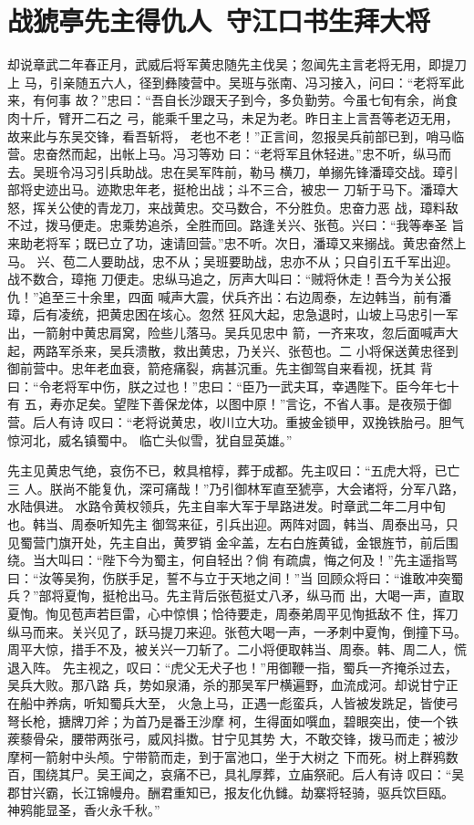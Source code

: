 \chapter{战猇亭先主得仇人~守江口书生拜大将}

却说章武二年春正月，武威后将军黄忠随先主伐吴；忽闻先主言老将无用，即提刀上
马，引亲随五六人，径到彝陵营中。吴班与张南、冯习接入，问曰：“老将军此来，有何事
故？”忠曰：“吾自长沙跟天子到今，多负勤劳。今虽七旬有余，尚食肉十斤，臂开二石之
弓，能乘千里之马，未足为老。昨日主上言吾等老迈无用，故来此与东吴交锋，看吾斩将，
老也不老！”正言间，忽报吴兵前部已到，哨马临营。忠奋然而起，出帐上马。冯习等劝
曰：“老将军且休轻进。”忠不听，纵马而去。吴班令冯习引兵助战。忠在吴军阵前，勒马
横刀，单搦先锋潘璋交战。璋引部将史迹出马。迹欺忠年老，挺枪出战；斗不三合，被忠一
刀斩于马下。潘璋大怒，挥关公使的青龙刀，来战黄忠。交马数合，不分胜负。忠奋力恶
战，璋料敌不过，拨马便走。忠乘势追杀，全胜而回。路逢关兴、张苞。兴曰：“我等奉圣
旨来助老将军；既已立了功，速请回营。”忠不听。次日，潘璋又来搦战。黄忠奋然上马。
兴、苞二人要助战，忠不从；吴班要助战，忠亦不从；只自引五千军出迎。战不数合，璋拖
刀便走。忠纵马追之，厉声大叫曰：“贼将休走！吾今为关公报仇！”追至三十余里，四面
喊声大震，伏兵齐出：右边周泰，左边韩当，前有潘璋，后有凌统，把黄忠困在垓心。忽然
狂风大起，忠急退时，山坡上马忠引一军出，一箭射中黄忠肩窝，险些儿落马。吴兵见忠中
箭，一齐来攻，忽后面喊声大起，两路军杀来，吴兵溃散，救出黄忠，乃关兴、张苞也。二
小将保送黄忠径到御前营中。忠年老血衰，箭疮痛裂，病甚沉重。先主御驾自来看视，抚其
背曰：“令老将军中伤，朕之过也！”忠曰：“臣乃一武夫耳，幸遇陛下。臣今年七十有
五，寿亦足矣。望陛下善保龙体，以图中原！”言讫，不省人事。是夜殒于御营。后人有诗
叹曰：“老将说黄忠，收川立大功。重披金锁甲，双挽铁胎弓。胆气惊河北，威名镇蜀中。
临亡头似雪，犹自显英雄。”

先主见黄忠气绝，哀伤不已，敕具棺椁，葬于成都。先主叹曰：“五虎大将，已亡三
人。朕尚不能复仇，深可痛哉！”乃引御林军直至猇亭，大会诸将，分军八路，水陆俱进。
水路令黄权领兵，先主自率大军于旱路进发。时章武二年二月中旬也。韩当、周泰听知先主
御驾来征，引兵出迎。两阵对圆，韩当、周泰出马，只见蜀营门旗开处，先主自出，黄罗销
金伞盖，左右白旌黄钺，金银旌节，前后围绕。当大叫曰：“陛下今为蜀主，何自轻出？倘
有疏虞，悔之何及！”先主遥指骂曰：“汝等吴狗，伤朕手足，誓不与立于天地之间！”当
回顾众将曰：“谁敢冲突蜀兵？”部将夏恂，挺枪出马。先主背后张苞挺丈八矛，纵马而
出，大喝一声，直取夏恂。恂见苞声若巨雷，心中惊惧；恰待要走，周泰弟周平见恂抵敌不
住，挥刀纵马而来。关兴见了，跃马提刀来迎。张苞大喝一声，一矛刺中夏恂，倒撞下马。
周平大惊，措手不及，被关兴一刀斩了。二小将便取韩当、周泰。韩、周二人，慌退入阵。
先主视之，叹曰：“虎父无犬子也！”用御鞭一指，蜀兵一齐掩杀过去，吴兵大败。那八路
兵，势如泉涌，杀的那吴军尸横遍野，血流成河。却说甘宁正在船中养病，听知蜀兵大至，
火急上马，正遇一彪蛮兵，人皆被发跣足，皆使弓弩长枪，搪牌刀斧；为首乃是番王沙摩
柯，生得面如噀血，碧眼突出，使一个铁蒺藜骨朵，腰带两张弓，威风抖擞。甘宁见其势
大，不敢交锋，拨马而走；被沙摩柯一箭射中头颅。宁带箭而走，到于富池口，坐于大树之
下而死。树上群鸦数百，围绕其尸。吴王闻之，哀痛不已，具礼厚葬，立庙祭祀。后人有诗
叹曰：“吴郡甘兴霸，长江锦幔舟。酬君重知已，报友化仇雠。劫寨将轻骑，驱兵饮巨瓯。
神鸦能显圣，香火永千秋。”

